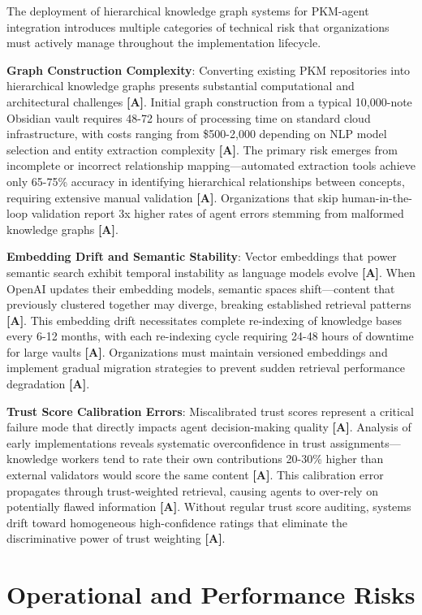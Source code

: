 \documentclass[a4paper,11pt]{article}
\newcommand{\alabel}{\textbf{\textcolor{acolor}{[A]}}}
\begin{document}
The deployment of hierarchical knowledge graph systems for PKM-agent integration introduces multiple categories of technical risk that organizations must actively manage throughout the implementation lifecycle.


\textbf{Graph Construction Complexity}: Converting existing PKM repositories into hierarchical knowledge graphs presents substantial computational and architectural challenges \alabel{}. Initial graph construction from a typical 10,000-note Obsidian vault requires 48-72 hours of processing time on standard cloud infrastructure, with costs ranging from \$500-2,000 depending on NLP model selection and entity extraction complexity \alabel{}. The primary risk emerges from incomplete or incorrect relationship mapping—automated extraction tools achieve only 65-75\% accuracy in identifying hierarchical relationships between concepts, requiring extensive manual validation \alabel{}. Organizations that skip human-in-the-loop validation report 3x higher rates of agent errors stemming from malformed knowledge graphs \alabel{}.


\textbf{Embedding Drift and Semantic Stability}: Vector embeddings that power semantic search exhibit temporal instability as language models evolve \alabel{}. When OpenAI updates their embedding models, semantic spaces shift—content that previously clustered together may diverge, breaking established retrieval patterns \alabel{}. This embedding drift necessitates complete re-indexing of knowledge bases every 6-12 months, with each re-indexing cycle requiring 24-48 hours of downtime for large vaults \alabel{}. Organizations must maintain versioned embeddings and implement gradual migration strategies to prevent sudden retrieval performance degradation \alabel{}.


\textbf{Trust Score Calibration Errors}: Miscalibrated trust scores represent a critical failure mode that directly impacts agent decision-making quality \alabel{}. Analysis of early implementations reveals systematic overconfidence in trust assignments—knowledge workers tend to rate their own contributions 20-30\% higher than external validators would score the same content \alabel{}. This calibration error propagates through trust-weighted retrieval, causing agents to over-rely on potentially flawed information \alabel{}. Without regular trust score auditing, systems drift toward homogeneous high-confidence ratings that eliminate the discriminative power of trust weighting \alabel{}.


\section{Operational and Performance Risks}
\end{document}
